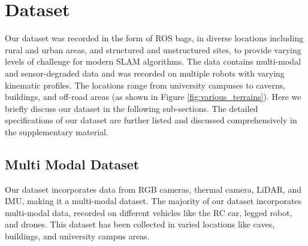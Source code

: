\documentclass[10pt,twocolumn,letterpaper]{article}
\begin{document}
\section{Dataset}\label{sec:dataset}

Our dataset was recorded in the form of ROS bags, in diverse locations including rural and urban areas, and structured and unstructured sites, to provide varying levels of challenge for modern SLAM algorithms. The data contains multi-modal and sensor-degraded data and was recorded on multiple robots with varying kinematic profiles. The locations range from university campuses to caverns, buildings, and off-road areas (as shown in Figure \ref{fig:various_terrains}). Here we briefly discuss our dataset in the following sub-sections. The detailed specifications of our dataset are further listed and discussed comprehensively in the supplementary material.





\subsection{Multi Modal Dataset}


Our dataset incorporates data from RGB cameras, thermal camera, LiDAR, and IMU, making it a multi-modal dataset. The majority of our dataset incorporates multi-modal data, recorded on different vehicles like the RC car, legged robot, and drones. This dataset has been collected in varied locations like caves, buildings, and university campus areas.
\end{document}
